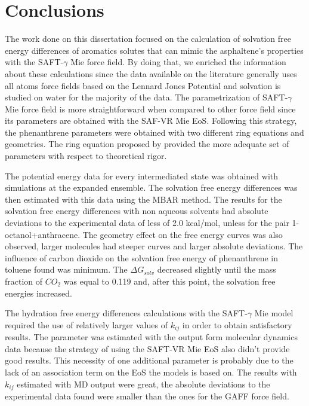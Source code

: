 \chapter{Conclusions} %

\label{Chapter6} %
The work done on this dissertation focused on the calculation of solvation free energy differences of aromatics solutes that can mimic the asphaltene's properties with the SAFT-$\gamma$ Mie force field. By doing that, we enriched the information about these calculations since the data available on the literature generally uses all atoms force fields based on the Lennard Jones Potential and solvation is studied on water for the majority of the data. The parametrization of SAFT-$\gamma$ Mie force field is more straightforward when compared to other force field since its parameters are obtained with the SAF-VR Mie EoS. Following this strategy, the phenanthrene parameters were obtained with two different ring equations and geometries. The ring equation proposed by  provided the more adequate set of parameters with respect to theoretical rigor. 

The potential energy data for every intermediated state was obtained with simulations at the expanded ensemble. The solvation free energy differences was then estimated with this data using the MBAR method. The results for the solvation free energy differences  with non aqueous solvents had absolute deviations to the experimental data of less of 2.0 kcal/mol, unless for the pair 1-octanol+anthracene. The geometry effect on the free energy curves was also observed, larger molecules had steeper curves and larger absolute deviations. The influence of carbon dioxide on the solvation free energy of phenanthrene in toluene found was minimum. The $\Delta G_{solv}$ decreased slightly until the mass fraction of $CO_{2}$ was equal to 0.119 and, after this point, the solvation free energies increased.   

The hydration free energy differences calculations with the SAFT-$\gamma$ Mie model required the use of relatively larger values of $k_{ij}$ in order to obtain satisfactory results. The parameter was estimated with the output form molecular dynamics data because the  strategy of using the SAFT-VR Mie EoS also didn't provide good results. This necessity of one additional parameter is probably due to the lack of an association term on the EoS the models is based on. The results with $k_{ij}$ estimated with MD output were great, the absolute deviations to the experimental data found were smaller than the ones for the GAFF force field.   

